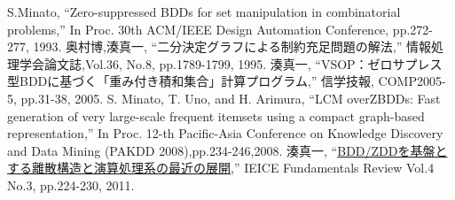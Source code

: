 \documentclass[a4paper]{book}
\begin{document}
\begin{thebibliography}{9}
	\label{sect:bib}
   S.Minato,
		``Zero-suppressed BDDs for set manipulation in combinatorial problems,''
		In Proc. 30th ACM/IEEE Design Automation Conference, pp.272-277, 1993.
   奥村博,湊真一,
		``二分決定グラフによる制約充足問題の解法,''
		情報処理学会論文誌,Vol.36, No.8, pp.1789-1799, 1995.
   湊真一,
		``VSOP：ゼロサプレス型BDDに基づく「重み付き積和集合」計算プログラム,''
		信学技報, COMP2005-5, pp.31-38, 2005.
   S. Minato, T. Uno, and H. Arimura,
		``LCM overZBDDs: Fast generation of very large-scale frequent itemsets using a compact graph-based representation,''
		In Proc. 12-th Pacific-Asia Conference on Knowledge Discovery and Data Mining (PAKDD 2008),pp.234-246,2008.
   湊真一,
		``\href{https://www.jstage.jst.go.jp/article/essfr/4/3/4_3_224/_pdf}{BDD/ZDDを基盤とする離散構造と演算処理系の最近の展開},''
    IEICE Fundamentals Review Vol.4 No.3,
    pp.224-230, 2011.

\end{thebibliography}
\end{document}
